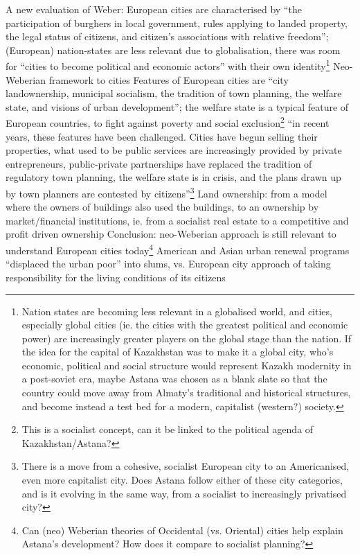 \documentclass{article}
\begin{document}
\begin{outline}
		\2 A new evaluation of Weber: European cities are characterised by ``the participation of burghers in local government, rules applying to landed property, the legal status of citizens, and citizen's associations with relative freedom''; (European) nation-states are less relevant due to globalisation, there was room for ``cities to become political and economic actors'' with their own identity\footnote{Nation states are becoming less relevant in a globalised world, and cities, especially global cities (ie. the cities with the greatest political and economic power) are increasingly greater players on the global stage than the nation. If the idea for the capital of Kazakhstan was to make it a global city, who's economic, political and social structure would represent Kazakh modernity in a post-soviet era, maybe Astana was chosen as a blank slate so that the country could move away from Almaty's traditional and historical structures, and become instead a test bed for a modern, capitalist (western?) society.}
	\1 Neo-Weberian framework to cities
		\2 Features of European cities are ``city landownership, municipal socialism, the tradition of town planning, the welfare state, and visions of urban development''; the welfare state is a typical feature of European countries, to fight against poverty and social exclusion\footnote{This is a socialist concept, can it be linked to the political agenda of Kazakhstan/Astana?}
		\2 ``in recent years, these features have been challenged. Cities have begun selling their properties, what used to be public services are increasingly provided by private entrepreneurs, public-private partnerships have replaced the tradition of regulatory town planning, the welfare state is in crisis, and the plans drawn up by town planners are contested by citizens''\footnote{There is a move from a cohesive, socialist European city to an Americanised, even more capitalist city. Does Astana follow either of these city categories, and is it evolving in the same way, from a socialist to increasingly privatised city?}
	\1 Land ownership: from a model where the owners of buildings also used the buildings, to an ownership by market/financial institutions, ie. from a socialist real estate to a competitive and profit driven ownership
	\1 Conclusion: neo-Weberian approach is still relevant to understand European cities today\footnote{Can (neo) Weberian theories of Occidental (vs. Oriental) cities help explain Astana's development? How does it compare to socialist planning?}
		\2 American and Asian urban renewal programs ``displaced the urban poor'' into slums, vs. European city approach of taking responsibility for the living conditions of its citizens
\end{outline}
\end{document}
